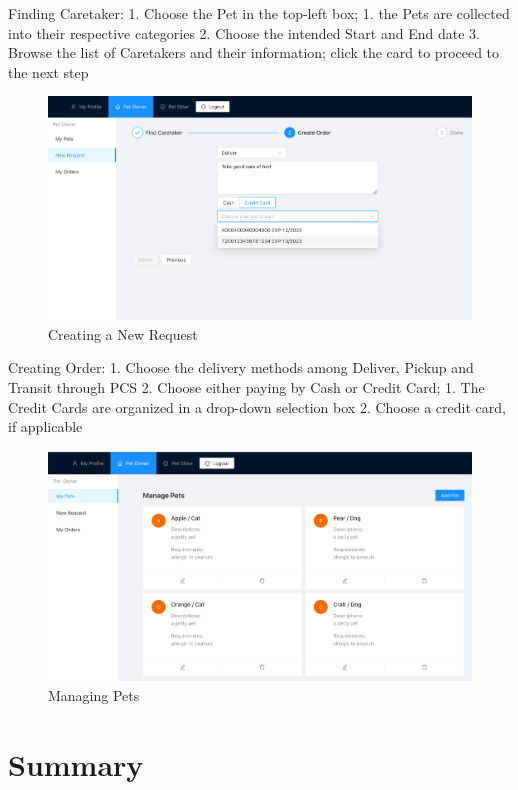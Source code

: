 \documentclass[
  paper=a4,
  ,captions=tableheading
]{scrartcl}
\begin{document}
Finding Caretaker: 1. Choose the Pet in the top-left box; 1. the Pets
are collected into their respective categories 2. Choose the intended
Start and End date 3. Browse the list of Caretakers and their
information; click the card to proceed to the next step

\begin{figure}
\centering
\includegraphics{create-order.png}
\caption{Creating a New Request}
\end{figure}

Creating Order: 1. Choose the delivery methods among Deliver, Pickup and
Transit through PCS 2. Choose either paying by Cash or Credit Card; 1.
The Credit Cards are organized in a drop-down selection box 2. Choose a
credit card, if applicable

\begin{figure}
\centering
\includegraphics{manage-pet.png}
\caption{Managing Pets}
\end{figure}

\hypertarget{summary}{%
\section{Summary}\label{summary}}
\end{document}

